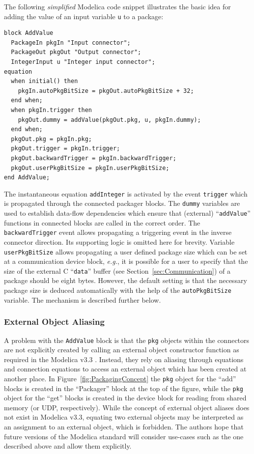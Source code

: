 \documentclass{resources/modelica}
\newcommand{\modelica}[1]{\lstinline[language=modelica]|#1|}
\begin{document}
The
following \emph{simplified} Modelica code snippet illustrates the basic idea for
adding the value of an input variable \modelica{u} to a package:
\begin{lstlisting}[language=modelica]
block AddValue
  PackageIn pkgIn "Input connector";
  PackageOut pkgOut "Output connector";
  IntegerInput u "Integer input connector";
equation
  when initial() then
    pkgIn.autoPkgBitSize = pkgOut.autoPkgBitSize + 32;
  end when;
  when pkgIn.trigger then
    pkgOut.dummy = addValue(pkgOut.pkg, u, pkgIn.dummy);
  end when;
  pkgOut.pkg = pkgIn.pkg;
  pkgOut.trigger = pkgIn.trigger;
  pkgOut.backwardTrigger = pkgIn.backwardTrigger;
  pkgOut.userPkgBitSize = pkgIn.userPkgBitSize;
end AddValue;
\end{lstlisting}
The instantaneous equation \modelica{addInteger} is activated by the event
\modelica{trigger} which is propagated through the connected packager blocks.
The \modelica{dummy} variables are used to establish data-flow dependencies
which ensure that (external) ``\modelica{addValue}'' functions in connected
blocks are called in the correct order. The \modelica{backwardTrigger} event
allows propagating a triggering event in the inverse connector direction.
Its supporting logic is omitted here for brevity. Variable
\modelica{userPkgBitSize} allows propagating a user defined package size which
can be set at a communication device block, \textit{e.g.}, it is possible for a
user to specify that the size of the external C ``\modelica{data}'' buffer (see
Section~\ref{sec:Communication}) of a package should be eight bytes. However,
the default setting is that the necessary package size is deduced automatically
with the help of the \modelica{autoPkgBitSize} variable. The mechanism is
described further below.

\subsubsection{External Object Aliasing}
\label{sec:External Object Aliasing}

A problem with the \modelica{AddValue} block is that the \modelica{pkg}
objects within the connectors are not explicitly created by calling an external object constructor
function as required in the Modelica v3.3 \cite[p.\@~165]{ModelicaAssociation2014}.
Instead, they rely on aliasing through equations and connection equations to
access an external object which has been created at another place. In
Figure~\ref{fig:PackagingConcept} the \modelica{pkg} object for the ``add''
blocks is created in the  ``Packager'' block at the top of the figure, while the
\modelica{pkg} object for the ``get'' blocks is created in the device block for reading from
shared memory (or UDP, respectively). While the concept of external object
aliases does not exist in Modelica v3.3, equating two external
objects may be interpreted as an assignment to an external object,
which is forbidden. The authors hope that future versions of
the Modelica standard will consider use-cases such as the one described above
and allow them explicitly.
\end{document}
